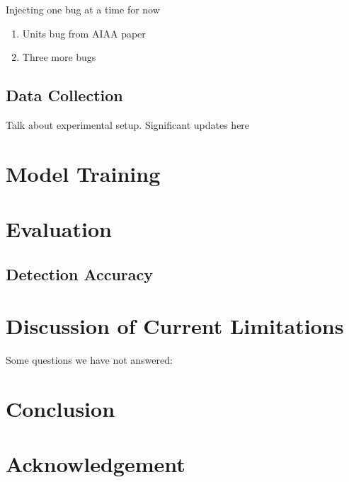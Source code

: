 Injecting one bug at a time for now

\begin{enumerate}
\item Units bug from AIAA paper
\item Three more bugs
\end{enumerate}

\subsection{Data Collection}

Talk about experimental setup. Significant updates here


\section{Model Training}


\section{Evaluation}


\subsection{Detection Accuracy}


\section{Discussion of Current Limitations}


Some questions we have not answered:


\section{Conclusion}

\section{Acknowledgement}
